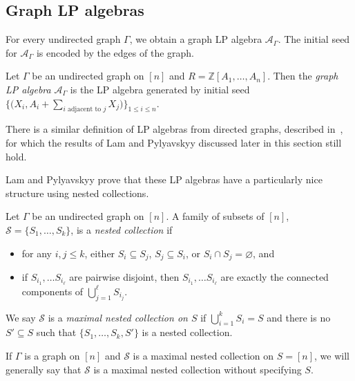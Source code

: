 \documentclass[10pt,a4paper]{amsart}
\numberwithin{equation}{section}
\newcommand{\calS}{\mathcal{S}}
\newcommand{\Z}{\mathbb{Z}}
\begin{document}
\subsection{Graph LP algebras}\label{sec:graph-LP}
For every undirected graph $\Gamma$, we obtain a graph LP algebra $\mathcal{A}_\Gamma$. The initial seed for $\mathcal{A}_\Gamma$ is encoded by the edges of the graph.
\begin{Definition}\label{defn:graph-LP}
Let $\Gamma$ be an undirected graph on $[n]$ and $R=\Z[A_1,\dots,A_n]$. Then the \emph{graph LP algebra} $\mathcal{A}_\Gamma$ is the LP algebra generated by initial seed $ \big\{\big(X_i,A_i+\sum_{i\text{ adjacent to }j}X_j\big)\big\}_{1\leq i\leq n}$.
\end{Definition}
\begin{Remark}There is a similar definition of LP algebras from directed graphs, described in~\cite{LP-16}, for which the results of Lam and Pylyavskyy discussed later in this section still hold.
\end{Remark}
Lam and Pylyavskyy prove that these LP algebras have a particularly nice structure using nested collections.
\begin{Definition}\label{defn:nested-coll}
Let $\Gamma$ be an undirected graph on $[n]$. A family of subsets of $[n]$, $\calS=\{S_1,\dots,S_k\}$, is a \emph{nested collection} if
\begin{itemize}\itemsep=0pt
 \item for any $i,j\leq k$, either $S_i\subseteq S_j$, $S_j\subseteq S_i$, or $S_i\cap S_j=\varnothing$, and
 \item if $S_{i_1},\dots S_{i_\ell}$ are pairwise disjoint, then $S_{i_1},\dots S_{i_\ell}$ are exactly the connected components of $\bigcup_{j=1}^\ell S_{i_j}$.
\end{itemize}
We say $\calS$ is a \emph{maximal nested collection on $S$} if $\bigcup_{i=1}^k S_i=S$ and there is no $S'\subseteq S$ such that $\{S_1,\dots,S_k,S'\}$ is a nested collection.
\end{Definition}
If $\Gamma$ is a graph on $[n]$ and $\calS$ is a maximal nested collection on $S=[n]$, we will generally say that $\calS$ is a maximal nested collection without specifying $S$.
\end{document}
